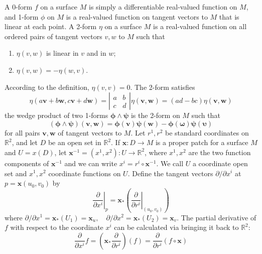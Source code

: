 \documentclass{article}
\newcommand{\tmmathbf}[1]{\ensuremath{\boldsymbol{#1}}}
\newenvironment{enumeratenumeric}{\begin{enumerate}[1.] }{\end{enumerate}}
\begin{document}
A 0-form $f$ on a surface $M$ is simply a differentiable real-valued function
on $M$, and 1-form $\phi$ on $M$ is a real-valued function on tangent vectors
to $M$ that is linear at each point. A 2-form $\eta$ on a surface $M$ is a
real-valued function on all ordered pairs of tangent vectors $v, w$ to $M$
such that
\begin{enumeratenumeric}
  \item $\eta (v, w)$ is linear in $v$ and in $w$;
  
  \item $\eta (v, w) = - \eta (w, v)$.
\end{enumeratenumeric}
According to the definition, $\eta (v, v) = 0$. The 2-form satisfies
\begin{equation}
  \eta (a\tmmathbf{v}+ b\tmmathbf{w}, c\tmmathbf{v}+ d\tmmathbf{w}) =
  \left|\begin{array}{cc}
    a & b\\
    c & d
  \end{array}\right| \eta (\tmmathbf{v}, \tmmathbf{w}) = (a d - b c) \eta
  (\tmmathbf{v}, \tmmathbf{w})
\end{equation}
the wedge product of two 1-forms $\tmmathbf{\phi} \wedge \tmmathbf{\psi}$ is
the 2-form on $M$ such that
\[ (\tmmathbf{\phi} \wedge \tmmathbf{\psi}) (\tmmathbf{v}, \tmmathbf{w})
   =\tmmathbf{\phi} (\tmmathbf{v}) \tmmathbf{\psi} (\tmmathbf{w})
   -\tmmathbf{\phi} (\tmmathbf{\omega}) \tmmathbf{\psi} (\tmmathbf{\upsilon})
\]
for all pairs $\tmmathbf{v}, \tmmathbf{w}$ of tangent vectors to $M$. Let
$r^1, r^2$ be standard coordinates on $\mathbb{R}^2$, and let $D$ be an open
set in $\mathbb{R}^2$. If $\mathbf{x}: D \rightarrow M$ is a proper patch for
a surface $M$ and $U = x (D)$, let $\mathbf{x}^{- 1} = (x^1, x^2) : U
\rightarrow \mathbb{R}^2$, where $x^1, x^2$ are the two function components of
$\mathbf{x}^{- 1}$ and we can write $x^i = r^i \circ \mathbf{x}^{- 1}$. We
call $U$ a coordinate open set and $x^1, x^2$ coordinate functions on $U$.
Define the tangent vectors $\partial / \partial x^i$ at $p =\mathbf{x} (u_0,
v_0)$ by
\[ \left. \frac{\partial}{\partial x^i} \right|_p =\mathbf{x}_{\ast} \left(
   \left. \frac{\partial}{\partial r^i} \right|_{(u_0, v_0)} \right) \]
where $\partial / \partial x^1 =\mathbf{x}_{\ast} (U_1) =\mathbf{x}_u, \quad
\partial / \partial x^2 =\mathbf{x}_{\ast} (U_2) =\mathbf{x}_v$. The partial
derivative of $f$ with respect to the coordinate $x^i$ can be calculated via
bringing it back to $\mathbb{R}^2$:
\begin{equation}
  \frac{\partial}{\partial x^i} f = \left( \mathbf{x}_{\ast}
  \frac{\partial}{\partial r^i} \right) (f) = \frac{\partial}{\partial r^i} (f
  \circ \mathbf{x})
\end{equation}
\end{document}
